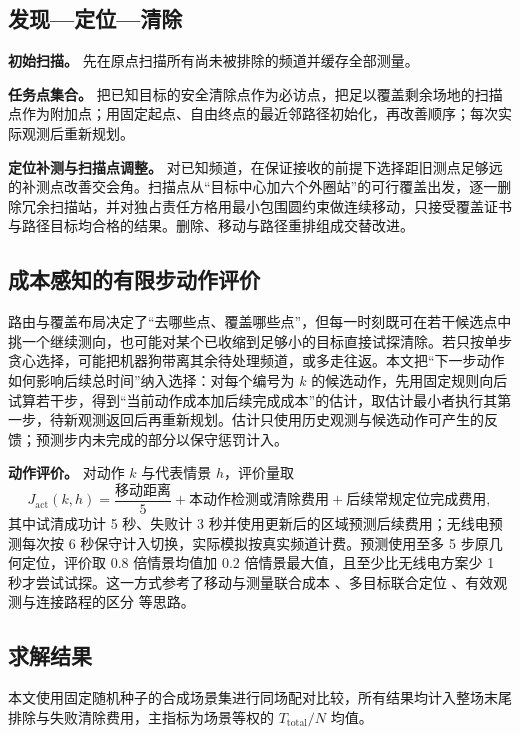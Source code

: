 \documentclass[UTF8,a4paper,zihao=-4,fontset=none]{ctexart}
\begin{document}
\subsection{发现—定位—清除}

\textbf{初始扫描。} 先在原点扫描所有尚未被排除的频道并缓存全部测量。

\textbf{任务点集合。} 把已知目标的安全清除点作为必访点，把足以覆盖剩余场地的扫描点作为附加点；用固定起点、自由终点的最近邻路径初始化，再改善顺序；每次实际观测后重新规划。

\textbf{定位补测与扫描点调整。} 对已知频道，在保证接收的前提下选择距旧测点足够远的补测点改善交会角。扫描点从“目标中心加六个外圈站”的可行覆盖出发，逐一删除冗余扫描站，并对独占责任方格用最小包围圆约束做连续移动，只接受覆盖证书与路径目标均合格的结果。删除、移动与路径重排组成交替改进。

\subsection{成本感知的有限步动作评价}

路由与覆盖布局决定了“去哪些点、覆盖哪些点”，但每一时刻既可在若干候选点中挑一个继续测向，也可能对某个已收缩到足够小的目标直接试探清除。若只按单步贪心选择，可能把机器狗带离其余待处理频道，或多走往返。本文把“下一步动作如何影响后续总时间”纳入选择：对每个编号为 \(k\) 的候选动作，先用固定规则向后试算若干步，得到“当前动作成本加后续完成成本”的估计，取估计最小者执行其第一步，待新观测返回后再重新规划。估计只使用历史观测与候选动作可产生的反馈；预测步内未完成的部分以保守惩罚计入。

\textbf{动作评价。} 对动作 \(k\) 与代表情景 \(h\)，评价量取
\begin{equation}
  J_{\mathrm{act}}(k,h)=\frac{\text{移动距离}}{5}+\text{本动作检测或清除费用}+\text{后续常规定位完成费用},
  \label{eq:q3-action}
\end{equation}
其中试清成功计 5 秒、失败计 3 秒并使用更新后的区域预测后续费用；无线电预测每次按 6 秒保守计入切换，实际模拟按真实频道计费。预测使用至多 5 步原几何定位，评价取 \(0.8\) 倍情景均值加 \(0.2\) 倍情景最大值，且至少比无线电方案少 1 秒才尝试试探。这一方式参考了移动与测量联合成本 \cite{VanderHook2014}、多目标联合定位 \cite{Engin2020}、有效观测与连接路程的区分 \cite{Song2012} 等思路。

\subsection{求解结果}

本文使用固定随机种子的合成场景集进行同场配对比较，所有结果均计入整场末尾排除与失败清除费用，主指标为场景等权的 \(T_{\mathrm{total}}/N\) 均值。
\end{document}
